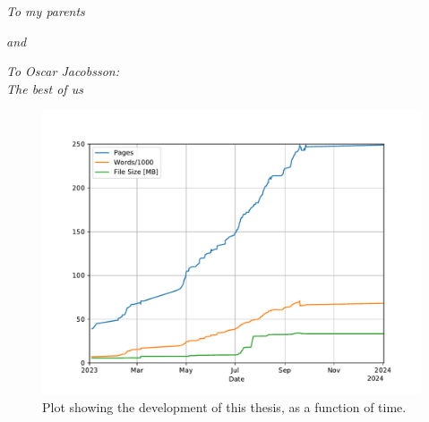 
\begin{dedication} 

\textit{To my parents}

\vspace{5cm}
\textit{and}
\vspace{5cm}

\textit{To Oscar Jacobsson:\\The best of us}
\newpage
\begin{figure}[p]
    \centering
    \includegraphics[width=\textwidth]{Figs/pdfstats_plot.pdf}
    \caption[]
    {Plot showing the development of this thesis, as a function of time.}
\end{figure}
\end{dedication}

